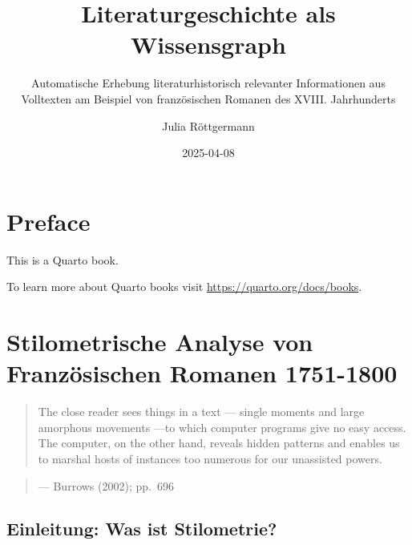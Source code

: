 \documentclass[
  12pt,
  letterpaper,
  DIV=11,
  numbers=noendperiod]{scrreprt}
\title{Literaturgeschichte als Wissensgraph}
\subtitle{Automatische Erhebung literaturhistorisch relevanter
Informationen aus Volltexten am Beispiel von französischen Romanen des
XVIII. Jahrhunderts}
\author{Julia Röttgermann}
\date{2025-04-08}
\renewcommand*\contentsname{Table of contents}
\newcommand\contentsname{Table of contents}
\begin{document}
\maketitle

\renewcommand*\contentsname{Table of contents}
{
\hypersetup{linkcolor=}
\setcounter{tocdepth}{2}
\tableofcontents
}


\chapter*{Preface}\label{preface}


This is a Quarto book.

To learn more about Quarto books visit
\url{https://quarto.org/docs/books}.


\chapter{\texorpdfstring{\textbf{Stilometrische Analyse von
Französischen Romanen
1751-1800}}{Stilometrische Analyse von Französischen Romanen 1751-1800}}\label{stilometrische-analyse-von-franzuxf6sischen-romanen-1751-1800}

\begin{quote}
The close reader sees things in a text --- single moments and large
amorphous movements ---to which computer programs give no easy access.
The computer, on the other hand, reveals hidden patterns and enables us
to marshal hosts of instances too numerous for our unassisted powers.
\end{quote}

\begin{quote}
--- Burrows (2002); pp.~696
\end{quote}

\section{Einleitung: Was ist
Stilometrie?}\label{einleitung-was-ist-stilometrie}
\end{document}
